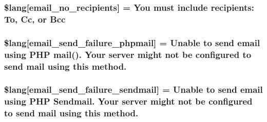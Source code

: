 \subsubsection[{\$lang}]{\setlength{\rightskip}{0pt plus 5cm}\$lang\mbox{[}\textquotesingle{}email\+\_\+no\+\_\+recipients\textquotesingle{}\mbox{]} = \textquotesingle{}You must include recipients\+: To, Cc, or Bcc\textquotesingle{}}\label{system_2language_2english_2email__lang_8php_a8f9d5a049f4dd899d4e61f6d56be5071}
\hypertarget{system_2language_2english_2email__lang_8php_a99a2ce89426340b4c96a245b7874a99d}{}
\subsubsection[{\$lang}]{\setlength{\rightskip}{0pt plus 5cm}\$lang\mbox{[}\textquotesingle{}email\+\_\+send\+\_\+failure\+\_\+phpmail\textquotesingle{}\mbox{]} = \textquotesingle{}Unable to send email using P\+H\+P mail(). Your server might not be configured to send mail using this method.\textquotesingle{}}\label{system_2language_2english_2email__lang_8php_a99a2ce89426340b4c96a245b7874a99d}
\hypertarget{system_2language_2english_2email__lang_8php_a0cfda188d86472ad2f3b96a67de75b4d}{}
\subsubsection[{\$lang}]{\setlength{\rightskip}{0pt plus 5cm}\$lang\mbox{[}\textquotesingle{}email\+\_\+send\+\_\+failure\+\_\+sendmail\textquotesingle{}\mbox{]} = \textquotesingle{}Unable to send email using P\+H\+P Sendmail. Your server might not be configured to send mail using this method.\textquotesingle{}}\label{system_2language_2english_2email__lang_8php_a0cfda188d86472ad2f3b96a67de75b4d}
\hypertarget{system_2language_2english_2email__lang_8php_a37e19fc7057ba5d5300dd3e83cefc5a2}{}
